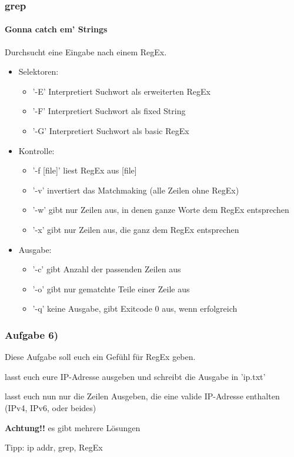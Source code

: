 \documentclass[12pt,utf8]{beamer}
\begin{document}
\begin{frame}
\frametitle{grep}
\framesubtitle{\textcolor{ownDarkOr}{Gonna catch em' Strings}}
Durchsucht eine Eingabe nach einem RegEx.
\begin{itemize}[<+->]
	\item Selektoren:
	\begin{itemize}[<+->]
		\item '-E' Interpretiert Suchwort als erweiterten RegEx
		\item '-F' Interpretiert Suchwort als fixed String
		\item '-G' Interpretiert Suchwort als basic RegEx
	\end{itemize}
	\item Kontrolle:
	\begin{itemize}
		\item '-f [file]' liest RegEx aus [file]
		\item '-v' invertiert das Matchmaking (alle Zeilen ohne RegEx)
		\item '-w' gibt nur Zeilen aus, in denen ganze Worte dem RegEx entsprechen
		\item '-x' gibt nur Zeilen aus, die ganz dem RegEx entsprechen
	\end{itemize}
	\item Ausgabe:
	\begin{itemize}
		\item '-c' gibt Anzahl der passenden Zeilen aus
		\item '-o' gibt nur gematchte Teile einer Zeile aus
		\item '-q' keine Ausgabe, gibt Exitcode 0 aus, wenn erfolgreich
	\end{itemize}
\end{itemize}
\end{frame}

\begin{frame}
\frametitle{Aufgabe 6)}
Diese Aufgabe soll euch ein Gefühl für RegEx geben.
\begin{itemize}
{\footnotesize
	\item lasst euch eure IP-Adresse ausgeben und schreibt die Ausgabe in 'ip.txt'
	\item lasst euch nun nur die Zeilen Ausgeben, die eine valide IP-Adresse enthalten (IPv4, IPv6, oder beides)
	\item \textbf{Achtung!!} es gibt mehrere Lösungen
	}
\end{itemize}
{\scriptsize Tipp: ip addr, grep, RegEx}
\end{frame}
\end{document}
